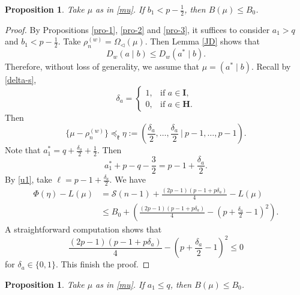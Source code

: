 \documentclass[11pt]{amsart}
\theoremstyle{plain}
\newtheorem{prop}[thm]{Proposition}
\theoremstyle{definition}
\newcommand{\mfk}{\mathfrak{k}}
\newcommand{\caS}{\mathcal{S}}
\begin{document}
\begin{prop}
	Take $\mu$ as in \eqref{mu}. If $b_1< p-\frac{1}{2}$, then $B(\mu)\le B_0$.
\end{prop}

\begin{proof}
	By Propositions \ref{pro-1}, \ref{pro-2} and \ref{pro-3}, it suffices to consider $a_1>q$ and $b_1<p-\frac{1}{2}$. Take $\rho_n^{(w)}=\Omega_{\lhd}(\mu)$. Then Lemma \ref{JD} shows that
	\[D_w(a\mid b)\le D_w(a^*\mid b).\]
	Therefore, without loss of generality, we assume that $\mu=(a^*\mid b)$.  Recall by \eqref{delta-s},
	\[\delta_a=\left\{
	\begin{array}{ll}
		1,& \mbox{if $a\in \textbf{I}$},\\
		0, & \mbox{if $a\in \textbf{H}$}.
	\end{array}
	\right.\]
	Then
	\[\{\mu-\rho_n^{(w)}\}\preceq_\mfk \eta :=\left(\frac{\delta_a}{2},\dots,\frac{\delta_a}{2}\ \bigg|\ p-1,\dots,p-1\right).\]
	Note that $a_1^*=q+\frac{\delta_a}{2}+\frac{1}{2}$. Then
	\[a_1^*+p-q-\frac{3}{2}=p-1+\frac{\delta_a}{2}.\]
	By \eqref{u1}, take $\ell=p-1+\frac{\delta_a}{2}$. We have
	\begin{align*}
	\Phi(\eta)-L(\mu)&=\caS(n-1)+\frac{(2p-1)(p-1+p\delta_a)}{4}-L(\mu)\\
	&\le B_0+\left(\frac{(2p-1)(p-1+p\delta_a)}{4}-\left(p+\frac{\delta_a}{2}-1\right)^2\right).
	\end{align*}
	A straightforward computation shows that
	\[\frac{(2p-1)(p-1+p\delta_a)}{4}-\left(p+\frac{\delta_a}{2}-1\right)^2\le 0\]
	for $\delta_a\in\{0,1\}$. This finish the proof.
\end{proof}

\begin{prop}
	Take $\mu$ as in \eqref{mu}. If $a_1\le q$, then $B(\mu)\le B_0$.
\end{prop}
\end{document}
